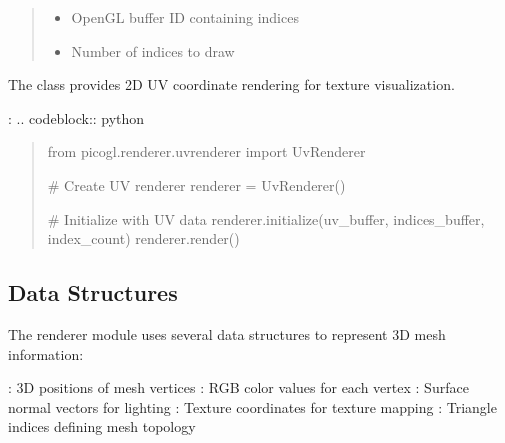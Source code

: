\documentclass[a4paper,10pt,english,openany,oneside]{sphinxmanual}
\begin{document}
\begin{fulllineitems}
\begin{fulllineitems}
\begin{quote}
\begin{description}
\begin{itemize}
\item {} 
\sphinxAtStartPar
{} \textendash{} OpenGL buffer ID containing indices

\item {} 
\sphinxAtStartPar
{} \textendash{} Number of indices to draw

\end{itemize}

\end{description}\end{quote}

\end{fulllineitems}


\end{fulllineitems}


\sphinxAtStartPar
The  class provides 2D UV coordinate rendering for texture visualization.

\sphinxAtStartPar
{}:
.. code\sphinxhyphen{}block:: python
\begin{quote}

\sphinxAtStartPar
from picogl.renderer.uvrenderer import UvRenderer

\sphinxAtStartPar
\# Create UV renderer
renderer = UvRenderer()

\sphinxAtStartPar
\# Initialize with UV data
renderer.initialize(uv\_buffer, indices\_buffer, index\_count)
renderer.render()
\end{quote}


\subsection{Data Structures}
\label{\detokenize{api/renderer:data-structures}}
\sphinxAtStartPar
The renderer module uses several data structures to represent 3D mesh information:

\sphinxAtStartPar
{}: 3D positions of mesh vertices
: RGB color values for each vertex
: Surface normal vectors for lighting
: Texture coordinates for texture mapping
: Triangle indices defining mesh topology
\end{document}
